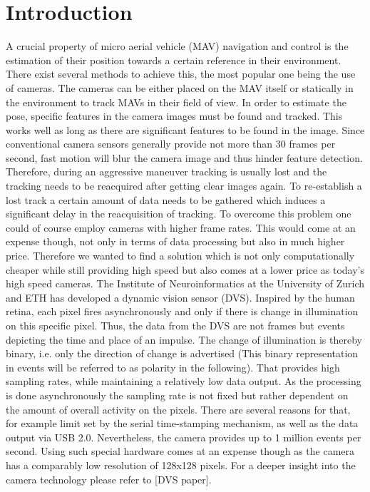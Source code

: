 \chapter{Introduction}\label{sec:introduction}

A crucial property of micro aerial vehicle (MAV) navigation and control is the estimation of their position towards a certain reference in their environment. There exist several methods to achieve this, the most popular one being the use of cameras. The cameras can be either placed on the MAV itself or statically in the environment to track MAVs in their field of view. In order to estimate the pose, specific features in the camera images must be found and tracked. This works well as long as there are significant features to be found in the image. Since conventional camera sensors generally provide not more than 30 frames per second, fast motion will blur the camera image and thus hinder feature detection.  Therefore, during an aggressive maneuver tracking is usually lost and the tracking needs to be reacquired after getting clear images again. To re-establish a lost track a certain amount of data needs to be gathered which induces a significant delay in the reacquisition of tracking. To overcome this problem one could of course employ cameras with higher frame rates. This would come at an expense though, not only in terms of data processing but also in much higher price. Therefore we wanted to find a solution which is not only computationally cheaper while still providing high speed but also comes at a lower price as today’s high speed cameras.
The Institute of Neuroinformatics at the University of Zurich and ETH has developed a dynamic vision sensor (DVS). Inspired by the human retina, each pixel fires asynchronously and only if there is change in illumination on this specific pixel. Thus, the data from the DVS are not frames but events depicting the time and place of an impulse. The change of illumination is thereby binary, i.e. only the direction of change is advertised (This binary representation in events will be referred to as polarity in the following). That provides high sampling rates, while maintaining a relatively low data output. As the processing is done asynchronously the sampling rate is not fixed but rather dependent on the amount of overall activity on the pixels. There are several reasons for that, for example limit set by the serial time-stamping mechanism, as well as the data output via USB 2.0. Nevertheless, the camera provides up to 1 million events per second. Using such special hardware comes at an expense though as the camera has a comparably low resolution of 128x128 pixels. For a deeper insight into the camera technology please refer to [DVS paper]. 
